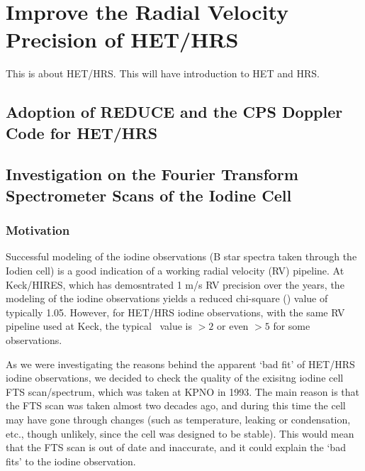 \chapter{Improve the Radial Velocity Precision of HET/HRS}

This is about HET/HRS. This will have introduction to HET and HRS.

\section{Adoption of REDUCE and the CPS Doppler Code for HET/HRS}


\section{Investigation on the Fourier Transform Spectrometer Scans of the Iodine Cell}

\subsection{Motivation}

Successful modeling of the iodine observations (B star spectra taken
through the Iodien cell) is a good indication of a working radial
velocity (RV) pipeline. At Keck/HIRES, which has demosntrated 1 m/s RV
precision over the years, the modeling of the iodine observations
yields a reduced chi-square (\chisq) value of typically 1.05. However,
for HET/HRS iodine observations, with the same RV pipeline used at
Keck, the typical \chisq\ value is $>2$ or even $>5$ for some
observations.

As we were investigating the reasons behind the apparent `bad fit' of
HET/HRS iodine observations, we decided to check the quality of the
exisitng iodine cell FTS scan/spectrum, which was taken at KPNO in
1993. The main reason is that the FTS scan was taken almost two
decades ago, and during this time the cell may have gone through
changes (such as temperature, leaking or condensation, etc., though
unlikely, since the cell was designed to be stable).  This would mean
that the FTS scan is out of date and inaccurate, and it could explain
the `bad fits' to the iodine observation.

